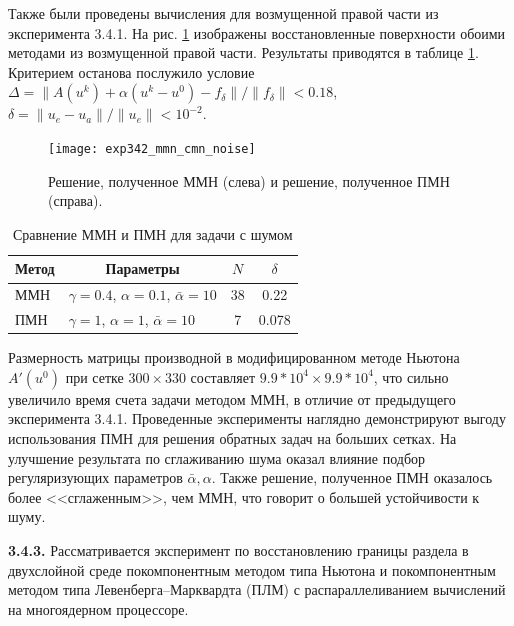 Также были проведены вычисления для возмущенной правой части из эксперимента 3.4.1. На рис. \ref{fig:exp342_mmn_cmn_noise} изображены восстановленные поверхности обоими методами из возмущенной правой части. Результаты приводятся в таблице \ref{table3.6}. Критерием останова послужило условие $\Delta=\|A(u^k)+\alpha(u^k-u^0)-f_\delta\|/\|f_\delta\|<0.18$, $\delta=\|u_e-u_a\|/\|u_e\|<10^{-2}$.
\begin{figure}
	\centering
	\texttt{[image: exp342\_mmn\_cmn\_noise]}
	\caption{Решение, полученное ММН (слева) и решение, полученное ПМН (справа).}
	\label{fig:exp342_mmn_cmn_noise}
\end{figure}
\begin{table}[]
	\centering
	\caption{Сравнение ММН и ПМН для задачи с шумом}
	\label{table3.6}
	\begin{tabular}{|l|l|c|c|}
		\hline
		\multicolumn{1}{|c|}{Метод} & \multicolumn{1}{c|}{Параметры}              & $N$ & $\delta$ \\ \hline
		ММН                         & $\gamma =0.4$, $\alpha=0.1$, $\bar\alpha=10$ & 38   & 0.22     \\ \hline
		ПМН                         & $\gamma =1$, $\alpha=1$, $\bar\alpha=10$    & 7   & 0.078    \\ \hline
	\end{tabular}
\end{table}

Размерность матрицы производной в модифицированном методе Ньютона $A'(u^0)$ при сетке $300\times330$ составляет $9.9 * 10^4\times 9.9 * 10^4$, что сильно увеличило время счета задачи методом ММН, в отличие от предыдущего эксперимента 3.4.1. Проведенные эксперименты наглядно демонстрируют выгоду использования ПМН для решения обратных задач на больших сетках. На улучшение результата по сглаживанию шума оказал влияние подбор регуляризующих параметров $\bar{\alpha}, \alpha$. Также решение, полученное ПМН оказалось более <<сглаженным>>, чем ММН, что говорит о большей устойчивости к шуму.
 
 {\bfseries 3.4.3.} Рассматривается эксперимент по восстановлению границы раздела в двухслойной среде покомпонентным методом типа Ньютона и покомпонентным методом типа Левенберга--Марквардта (ПЛМ)  с распараллеливанием вычислений на многоядерном процессоре.
 

